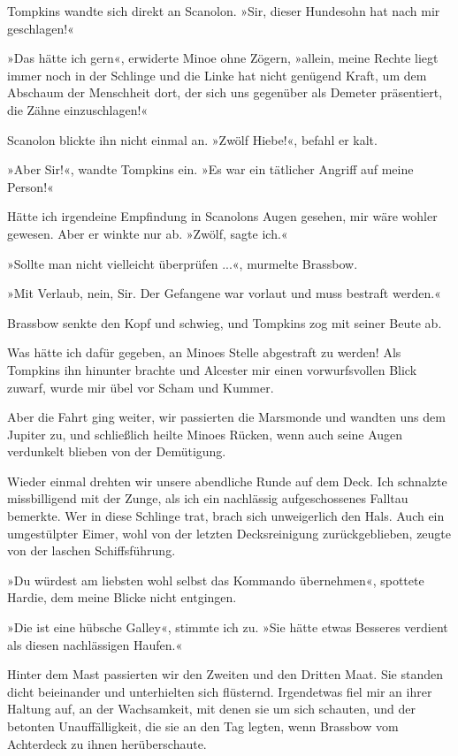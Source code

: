 Tompkins wandte sich direkt an Scanolon. »Sir, dieser Hundesohn hat
nach mir geschlagen!«

»Das hätte ich gern«, erwiderte Minoe ohne Zögern, »allein, meine
Rechte liegt immer noch in der Schlinge und die Linke hat nicht
genügend Kraft, um dem Abschaum der Menschheit dort, der sich uns
gegenüber als Demeter präsentiert, die Zähne einzuschlagen!«

Scanolon blickte ihn nicht einmal an. »Zwölf Hiebe!«, befahl er
kalt.

»Aber Sir!«, wandte Tompkins ein. »Es war ein tätlicher Angriff auf
meine Person!«

Hätte ich irgendeine Empfindung in Scanolons Augen gesehen, mir
wäre wohler gewesen. Aber er winkte nur ab. »Zwölf, sagte ich.«

»Sollte man nicht vielleicht überprüfen ...«, murmelte Brassbow.

»Mit Verlaub, nein, Sir. Der Gefangene war vorlaut und muss
bestraft werden.«

Brassbow senkte den Kopf und schwieg, und Tompkins zog mit seiner
Beute ab.

Was hätte ich dafür gegeben, an Minoes Stelle abgestraft zu werden!
Als Tompkins ihn hinunter brachte und Alcester mir einen
vorwurfsvollen Blick zuwarf, wurde mir übel vor Scham und Kummer.

Aber die Fahrt ging weiter, wir passierten die Marsmonde und
wandten uns dem Jupiter zu, und schließlich heilte Minoes Rücken,
wenn auch seine Augen verdunkelt blieben von der Demütigung.

\bigpar

Wieder einmal drehten wir unsere abendliche Runde auf dem Deck. Ich
schnalzte missbilligend mit der Zunge, als ich ein nachlässig
aufgeschossenes Falltau bemerkte. Wer in diese Schlinge trat, brach
sich unweigerlich den Hals. Auch ein umgestülpter Eimer, wohl von
der letzten Decksreinigung zurückgeblieben, zeugte von der laschen
Schiffsführung.

»Du würdest am liebsten wohl selbst das Kommando übernehmen«,
spottete Hardie, dem meine Blicke nicht entgingen.

»Die  ist eine hübsche Galley«, stimmte ich zu.
»Sie hätte etwas Besseres verdient als diesen nachlässigen
Haufen.«

Hinter dem Mast passierten wir den Zweiten und den Dritten Maat.
Sie standen dicht beieinander und unterhielten sich flüsternd.
Irgendetwas fiel mir an ihrer Haltung auf, an der Wachsamkeit, mit
denen sie um sich schauten, und der betonten Unauffälligkeit, die
sie an den Tag legten, wenn Brassbow vom Achterdeck zu ihnen
herüberschaute.

